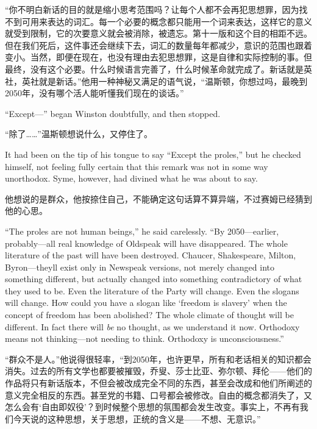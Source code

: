 \begin{paracol}{2}
\switchcolumn

``你不明白新话的目的就是缩小思考范围吗？让每个人都不会再犯思想罪，因为找不到可用来表达的词汇。每一个必要的概念都只能用一个词来表达，这样它的意义就受到限制，它的次要意义就会被消除，被遗忘。第十一版和这个目的相距不远。但在我们死后，这件事还会继续下去，词汇的数量每年都减少，意识的范围也跟着变小。当然，即便在现在，也没有理由去犯思想罪，这是自律和实际控制的事。但最终，没有这个必要。什么时候语言完善了，什么时候革命就完成了。新话就是英社，英社就是新话。''他用一种神秘又满足的语气说，``温斯顿，你想过吗，最晚到2050年，没有哪个活人能听懂我们现在的谈话。''

\switchcolumn*

``Except---'' began Winston doubtfully, and then stopped.

\switchcolumn

``除了\ldots\ldots''温斯顿想说什么，又停住了。

\switchcolumn*

It had been on the tip of his tongue to say ``Except the proles,'' but he
checked himself, not feeling fully certain that this remark was not in
some way unorthodox. Syme, however, had divined what he was about to
say.

\switchcolumn

他想说的是群众，他按捺住自己，不能确定这句话算不算异端，不过赛姆已经猜到他的心思。

\switchcolumn*

``The proles are not human beings,'' he said carelessly. ``By
2050---earlier, probably---all real knowledge of Oldspeak will have
disappeared. The whole literature of the past will have been destroyed.
Chaucer, Shakespeare, Milton, Byron---they\textquotesingle ll exist only in
Newspeak versions, not merely changed into something different, but actually
changed into something contradictory of what they used to be. Even the
literature of the Party will change. Even the slogans will change. How could
you have a slogan like `freedom is slavery' when the concept of freedom has
been abolished? The whole climate of thought will be different. In fact
there will \emph{be} no thought, as we understand it now. Orthodoxy means
not thinking---not needing to think. Orthodoxy is unconsciousness.''

\switchcolumn

``群众不是人。''他说得很轻率，``到2050年，也许更早，所有和老话相关的知识都会消失。过去的所有文学也都要被摧毁，乔叟、莎士比亚、弥尔顿、拜伦——他们的作品将只有新话版本，不但会被改成完全不同的东西，甚至会改成和他们所阐述的意义完全相反的东西。甚至党的书籍、口号都会被修改。自由的概念都消失了，又怎么会有`自由即奴役'？到时候整个思想的氛围都会发生改变。事实上，不再有我们今天说的这种思想，关于思想，正统的含义是——不想、无意识。''


\end{paracol}
